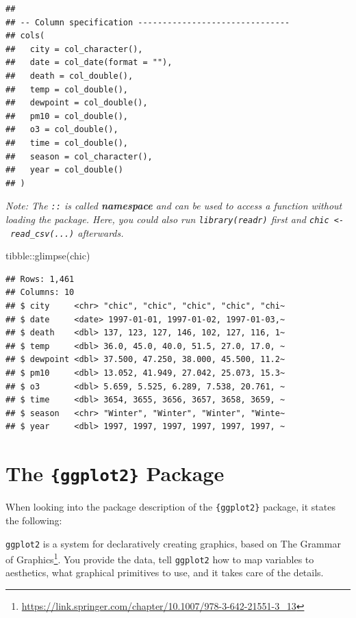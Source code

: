 \documentclass[
]{krantz}
\makeatletter
\newenvironment{Shaded}{\begin{snugshade}}{\end{snugshade}}
\newcommand{\FunctionTok}[1]{\textcolor[rgb]{0,0,0}{#1}}
\newcommand{\NormalTok}[1]{#1}
\newcommand{\SpecialCharTok}[1]{\textcolor[rgb]{0,0,0}{#1}}
\renewenvironment{quote}{\begin{VF}}{\end{VF}}
\renewcommand{\href}[2]{#2\footnote{\url{#1}}}
\newenvironment{kframe}{%
\medskip{}
\setlength{\fboxsep}{.8em}
 \def\at@end@of@kframe{}%
 \ifinner\ifhmode%
  \def\at@end@of@kframe{\end{minipage}}%
  \begin{minipage}{\columnwidth}%
 \fi\fi%
 \def\FrameCommand##1{\hskip\@totalleftmargin \hskip-\fboxsep
 \colorbox{shadecolor}{##1}\hskip-\fboxsep
     \hskip-\linewidth \hskip-\@totalleftmargin \hskip\columnwidth}%
 \MakeFramed {\advance\hsize-\width
   \@totalleftmargin\z@ \linewidth\hsize
   \@setminipage}}%
 {\par\unskip\endMakeFramed%
 \at@end@of@kframe}
\renewenvironment{Shaded}{\begin{kframe}}{\end{kframe}}
\makeatother
\begin{document}
\begin{verbatim}
## 
## -- Column specification -------------------------------
## cols(
##   city = col_character(),
##   date = col_date(format = ""),
##   death = col_double(),
##   temp = col_double(),
##   dewpoint = col_double(),
##   pm10 = col_double(),
##   o3 = col_double(),
##   time = col_double(),
##   season = col_character(),
##   year = col_double()
## )
\end{verbatim}

\emph{Note: The \texttt{::} is called \textbf{namespace} and can be used to access a function without loading the package. Here, you could also run \texttt{library(readr)} first and \texttt{chic\ \textless{}-\ read\_csv(...)} afterwards.}

\begin{Shaded}
\begin{Highlighting}[]
\NormalTok{tibble}\SpecialCharTok{::}\FunctionTok{glimpse}\NormalTok{(chic)}
\end{Highlighting}
\end{Shaded}

\begin{verbatim}
## Rows: 1,461
## Columns: 10
## $ city     <chr> "chic", "chic", "chic", "chic", "chi~
## $ date     <date> 1997-01-01, 1997-01-02, 1997-01-03,~
## $ death    <dbl> 137, 123, 127, 146, 102, 127, 116, 1~
## $ temp     <dbl> 36.0, 45.0, 40.0, 51.5, 27.0, 17.0, ~
## $ dewpoint <dbl> 37.500, 47.250, 38.000, 45.500, 11.2~
## $ pm10     <dbl> 13.052, 41.949, 27.042, 25.073, 15.3~
## $ o3       <dbl> 5.659, 5.525, 6.289, 7.538, 20.761, ~
## $ time     <dbl> 3654, 3655, 3656, 3657, 3658, 3659, ~
## $ season   <chr> "Winter", "Winter", "Winter", "Winte~
## $ year     <dbl> 1997, 1997, 1997, 1997, 1997, 1997, ~
\end{verbatim}

\hypertarget{ggplot}{%
\section{\texorpdfstring{The \texttt{\{ggplot2\}} Package}{The \{ggplot2\} Package}}\label{ggplot}}

When looking into the package description of the \texttt{\{ggplot2\}} package, it states the following:

\begin{quote}
\texttt{ggplot2} is a system for declaratively creating graphics, based on \href{https://link.springer.com/chapter/10.1007/978-3-642-21551-3_13}{The Grammar of Graphics}. You provide the data, tell \texttt{ggplot2} how to map variables to aesthetics, what graphical primitives to use, and it takes care of the details.
\end{quote}
\end{document}
